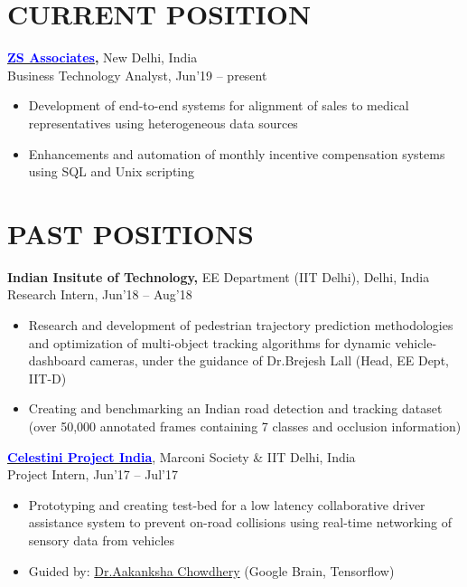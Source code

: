 \documentclass[11pt]{res} %
\newcommand{\titlegap}{5pt} %
\newcommand{\sectgap}{0.05in} %
\begin{document}
\begin{resume}

\section{CURRENT POSITION}
\vspace{\titlegap}
{\bf \href{https://www.zs.com/}{\textcolor{blue}{ZS Associates}},} New Delhi, India\\
Business Technology Analyst, Jun'19 -- present
\begin{itemize}
    \item Development of end-to-end systems for alignment of sales to medical representatives using heterogeneous data sources
    \item Enhancements and automation of monthly incentive compensation systems using SQL and Unix scripting
\end{itemize}


\vspace{\sectgap}
\hline

\section{PAST POSITIONS}
\vspace{\titlegap}
{\bf Indian Insitute of Technology,} EE Department (IIT Delhi), Delhi, India\\
Research Intern, Jun'18 – Aug'18
\begin{itemize}
    \item Research and development of pedestrian trajectory prediction methodologies and optimization of multi-object tracking algorithms for dynamic vehicle-dashboard cameras, under the guidance of Dr.Brejesh Lall (Head, EE Dept, IIT-D)
    \item Creating and benchmarking an Indian road detection and tracking dataset (over 50,000 annotated frames containing 7 classes and occlusion information)
\end{itemize} 

\href{https://celestini.org/programs/india/reducing-pedestrian-traffic-fatalities/}{\textbf{\textcolor{blue}{Celestini Project India}}}, Marconi Society \& IIT Delhi, India\\
Project Intern, Jun'17 – Jul'17
\begin{itemize}
\item Prototyping and creating test-bed for a low latency collaborative driver assistance system to prevent on-road collisions using real-time networking of sensory data from vehicles
\item Guided by:  \href{http://www.achowdhery.com/}{Dr.Aakanksha Chowdhery} (Google Brain, Tensorflow)
\end{itemize}



\end{resume}
\end{document}
